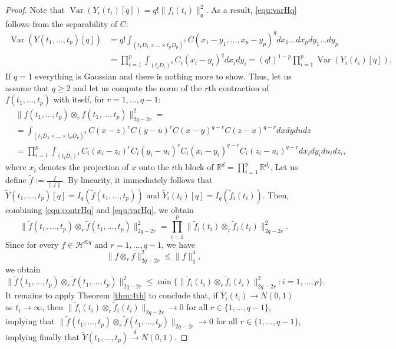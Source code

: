 \documentclass[12pt]{article}
\DeclareMathOperator{\var}{Var}
\DeclareMathOperator{\1}{1}
\theoremstyle{plain}
\theoremstyle{definition}
\begin{document}
\begin{proof}[Proof] Note that $\var (Y_i{(t_i)}[q])  = q! \|f_i(t_i)\|^2_q$. As a result, \eqref{equ:varHq} follows from the separability of $C$: 
\begin{align}
    \var(Y(t_1,\ldots,t_p)[q]) &= q! \int_{(t_1D_1\times \ldots \times t_pD_p)^2}C(x_1-y_1,\ldots,x_p-y_p)^q dx_1 \dots dx_p dy_1 \dots dy_p  \\
    &=  \prod_{i=1}^p {\int_{(t_i D_i)^2}C_i(x_i-y_i)^q dx_idy_i} =(q!)^{1-p} \prod_{i=1}^p \var (Y_i{(t_i)}[q]). \label{equ:varHqProof}
\end{align}
If $q=1$ everything is Gaussian and there is nothing more to show. Thus, let us assume that $q\ge2$ and let us compute the norm of the $r$th contraction of $f(t_1,\ldots,t_p)$ with itself, for $r=1,\ldots,q-1$: 
    \begin{align} \label{equ:contrHq}
    & \|f{(t_1,\dots,t_p)} \otimes_r  f{(t_1,\dots,t_p)}\|_{{2q-2r}}^2 = \\
    & = \int_{(t_1D_1\times\dots\times t_pD_p)^4} C(x-z)^rC(y-u)^rC(x-y)^{q-r}C(z-u)^{q-r}dxdydudz  \\
    & =  \prod_{i=1}^p \int_{(t_iD_i)^4} C_i(x_i-z_i)^rC_i(y_i-u_i)^rC_i(x_i-y_i)^{q-r}C_i(z_i-u_i)^{q-r}dx_idy_idu_idz_i ,
\end{align}
where $x_i$ denotes the projection of $x$ onto the $i$th block of $\mathbb R^{d}=\prod_{i=1}^p\mathbb R^{d_i}$. Let us define $\tilde f:= \frac{f}{\|f\|}$. By linearity, it immediately follows that $\widetilde Y{(t_1,\dots,t_p)}[q]=I_q(\tilde f{(t_1,\dots,t_p)})$ and $\widetilde Y_i{(t_i)}[q]=I_q(\tilde f_i{(t_i)})$. Then, combining \eqref{equ:contrHq} and \eqref{equ:varHq}, we obtain \begin{equation}\label{equ:contr}
    \|\widetilde f{(t_1,\ldots,t_p)}\otimes_r \widetilde f{(t_1,\ldots,t_p)}\|_{2q-2r}^2 =  \prod_{i=1}^p  \|\widetilde f_i{(t_i)}\otimes_r \widetilde f_i(t_i)\|_{2q-2r}^2.
\end{equation}
Since for every $f\in \mathcal H^{\otimes q}$ and $r=1,\ldots,q-1$, we have \begin{equation}\label{equ:aiuto}
    \|f\otimes_r f\|_{2q-2r} ^2 \le \|f\|_{q}^4,
\end{equation}
we obtain 
\begin{equation}
\|\widetilde f{(t_1,\dots,t_p)}\otimes_r \widetilde f{(t_1,\dots,t_p)}\|_{2q-2r}^2 \le  \min \{ \|\widetilde f_i{(t_i)}\otimes_r \widetilde f_i(t_i)\|_{2q-2r}^2 : i=1,\ldots, p\}.
\end{equation}
It remains to apply Theorem \ref{thm:4th} to conclude that, if $\widetilde Y_i(t_i)\rightarrow N(0,1)$ as $t_i\rightarrow\infty$, then $\|\widetilde f_i{(t_i)}\otimes_r \widetilde f_i(t_i)\|_{2q-2r}\to 0$ for all $r\in\{1,\ldots,q-1\}$, implying that 
$\|\widetilde f{(t_1,\dots,t_p)}\otimes_r \widetilde f{(t_1,\dots,t_p)}\|_{2q-2r}\to 0$ for all $r\in\{1,\ldots,q-1\}$, implying finally that $\widetilde Y(t_1,\ldots,t_p)\overset{d}{\rightarrow}N(0,1)$. 
\end{proof}
\end{document}
